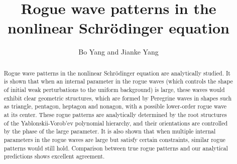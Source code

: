 \documentclass[amsmath,amssymb]{revtex4}
\begin{document}
\title{Rogue wave patterns in the nonlinear Schr\"{o}dinger equation}
\author{Bo Yang and Jianke Yang}

\begin{abstract}
Rogue wave patterns in the nonlinear Schr\"{o}dinger equation are analytically studied. It is shown that when an internal parameter in the rogue waves (which controls the shape of initial weak perturbations to the uniform background) is large, these waves would exhibit clear geometric structures, which are formed by Peregrine waves in shapes such as triangle, pentagon, heptagon and nonagon, with a possible lower-order rogue wave at its center. These rogue patterns are analytically determined by the root structures of the Yablonskii-Vorob'ev polynomial hierarchy, and their orientations are controlled by the phase of the large parameter. It is also shown that when multiple internal parameters in the rogue waves are large but satisfy certain constraints, similar rogue patterns would still hold. Comparison between true rogue patterns and our analytical predictions shows excellent agreement.
\end{abstract}

\maketitle
\end{document}
